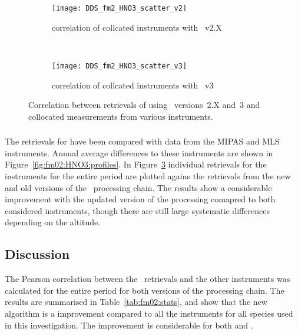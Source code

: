 \begin{figure}[htpb]
    \centering
    \begin{subfigure}[b]{0.49\textwidth}
        \texttt{[image: DDS\_fm2\_HNO3\_scatter\_v2]}
        \caption{correlation of collcated instruments with \smr~v2.X}
        \label{fig:fm02:HNO3:scatter:v2}
    \end{subfigure}
    \,
    \begin{subfigure}[b]{0.49\textwidth}
        \texttt{[image: DDS\_fm2\_HNO3\_scatter\_v3]}
        \caption{correlation of collcated instruments with \smr~v3}
        \label{fig:fm02:HNO3:scatter:v3}
    \end{subfigure}
    \caption{Correlation between retrievals of  using \smr\
    versions~2.X and~3 and collocated measurements from various instruments.}
    \label{fig:fm02:HNO3:scatter}
\end{figure}

\subsubsection{}
\label{sec:fm02:comparison:HNO3} The retrievals for  have been
compared with data from the MIPAS and MLS instruments. Annual average
differences to these instruments are shown in
Figure~\ref{fig:fm02:HNO3:profiles}. In Figure~\ref{fig:fm02:HNO3:scatter}
individual retrievals for the instruments for the entire period are plotted
agains the retrievals from the new and old versions of the \smr\ processing
chain. The results show a considerable improvement with the updated version of
the processing comapred to both considered instruments, though there are still
large systematic differences depending on the altitude.

\subsubsection{}
\label{sec:fm02:comparison:temperature}


\subsection{Discussion}
\label{sec:fm02:discussion}
The Pearson correlation between the \smr\ retrievals and the other instruments
was calculated for the entire period for both versions of the processing chain.
The results are summarised in Table~\ref{tab:fm02:stats}, and show that the
new algorithm is a improvement compared to all the instruments for all species
used in this investigation. The improvement is considerable for both \chem{O_3}
and \chem{HNO_3}.


